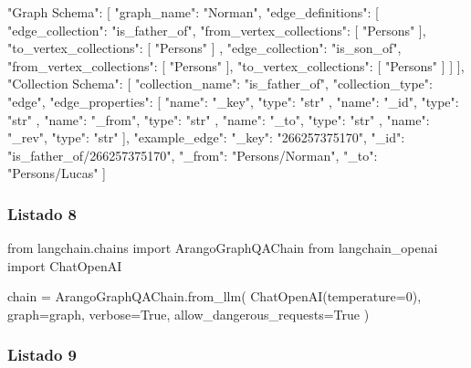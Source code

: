 \begin{APACode}
{
    "Graph Schema": [
        {
            "graph_name": "Norman",
            "edge_definitions": [
                {
                    "edge_collection": "is_father_of",
                    "from_vertex_collections": [
                        "Persons"
                    ],
                    "to_vertex_collections": [
                        "Persons"
                    ]
                },
                {
                    "edge_collection": "is_son_of",
                    "from_vertex_collections": [
                        "Persons"
                    ],
                    "to_vertex_collections": [
                        "Persons"
                    ]
                }
            ]
        }
    ],
    "Collection Schema": [
        {
            "collection_name": "is_father_of",
            "collection_type": "edge",
            "edge_properties": [
                {
                    "name": "_key",
                    "type": "str"
                },
                {
                    "name": "_id",
                    "type": "str"
                },
                {
                    "name": "_from",
                    "type": "str"
                },
                {
                    "name": "_to",
                    "type": "str"
                },
                {
                    "name": "_rev",
                    "type": "str"
                }
            ],
            "example_edge": {
                "_key": "266257375170",
                "_id": "is_father_of/266257375170",
                "_from": "Persons/Norman",
                "_to": "Persons/Lucas"
            }
        }
    ]
}
\end{APACode}

\subsubsection{Listado 8}
\label{anexo:code-4-4-1-8}

\begin{APACode}
from langchain.chains import ArangoGraphQAChain
from langchain_openai import ChatOpenAI

chain = ArangoGraphQAChain.from_llm(
    ChatOpenAI(temperature=0),
    graph=graph,
    verbose=True,
    allow_dangerous_requests=True
)
\end{APACode}

\subsubsection{Listado 9}
\label{anexo:code-4-4-1-9}

